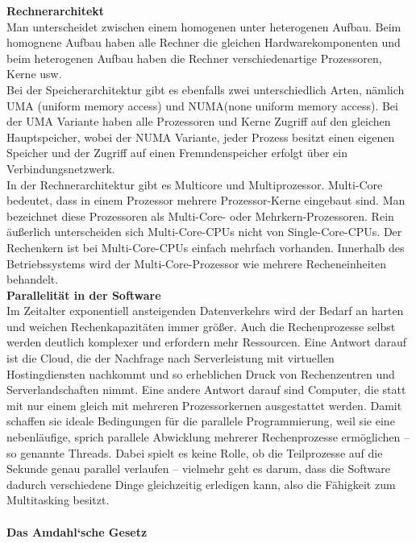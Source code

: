 \documentclass[a4paper,12pt]{article}
\begin{document}
\textbf{Rechnerarchitekt\\}
Man unterscheidet zwischen einem homogenen unter heterogenen Aufbau. Beim homognene Aufbau haben alle Rechner die gleichen Hardwarekomponenten und beim heterogenen Aufbau haben die Rechner verschiedenartige Prozessoren, Kerne usw.\\
Bei der Speicherarchitektur gibt es ebenfalls zwei unterschiedlich Arten, nämlich UMA (uniform memory access) und NUMA(none uniform memory access). Bei der UMA Variante haben alle Prozessoren und Kerne Zugriff auf den gleichen Hauptspeicher, wobei der NUMA Variante, jeder Prozess besitzt einen eigenen Speicher und der Zugriff auf einen Fremndenspeicher erfolgt über ein Verbindungsnetzwerk.\\
In der Rechnerarchitektur gibt es Multicore und Multiprozessor. Multi-Core bedeutet, dass in einem Prozessor mehrere Prozessor-Kerne eingebaut sind. Man bezeichnet diese Prozessoren als Multi-Core- oder Mehrkern-Prozessoren. Rein äußerlich unterscheiden sich Multi-Core-CPUs nicht von Single-Core-CPUs. Der Rechenkern ist bei Multi-Core-CPUs einfach mehrfach vorhanden. Innerhalb des Betriebssystems wird der Multi-Core-Prozessor wie mehrere Recheneinheiten behandelt.\\
\newpage
\noindent
\textbf{Parallelität in der Software\\}
Im Zeitalter exponentiell ansteigenden Datenverkehrs wird der Bedarf an harten und weichen Rechenkapazitäten immer größer. Auch die Rechenprozesse selbst werden deutlich komplexer und erfordern mehr Ressourcen. Eine Antwort darauf ist die Cloud, die der Nachfrage nach Serverleistung mit virtuellen Hostingdiensten nachkommt und so erheblichen Druck von Rechenzentren und Serverlandschaften nimmt.
Eine andere Antwort darauf sind Computer, die statt mit nur einem gleich mit mehreren Prozessorkernen ausgestattet werden. Damit schaffen sie ideale Bedingungen für die parallele Programmierung, weil sie eine nebenläufige, sprich parallele Abwicklung mehrerer Rechenprozesse ermöglichen – so genannte Threads. Dabei spielt es keine Rolle, ob die Teilprozesse auf die Sekunde genau parallel verlaufen – vielmehr geht es darum, dass die Software dadurch verschiedene Dinge gleichzeitig erledigen kann, also die Fähigkeit zum Multitasking besitzt.\\\\
\textbf{Das Amdahl‘sche Gesetz\\}
\end{document}
